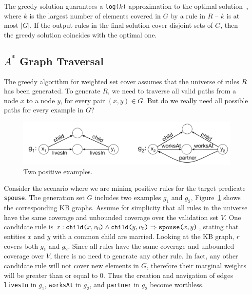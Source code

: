 The greedy solution guarantees a \texttt{log($k$)} approximation
to the optimal solution~\cite{chvatal1979greedy}, where $k$ is the largest number of elements covered in $G$ by a rule in $R$ -- $k$ is at most $|G|$. If the output rules in the final solution cover disjoint sets of $G$, then the greedy solution coincides with the optimal one.

\subsection{$A^*$ Graph Traversal}
The greedy algorithm for weighted set cover assumes that the universe of rules $R$ has been generated.
To generate $R$, we need to traverse all valid paths from a node $x$ to a node $y$, for every pair $(x,y) \in G$. But do we really need all possible paths for every example in $G$?
		\vspace{-1.5ex}

	\begin{figure}[htb]
		\centering
		\includegraphics[width=0.99\columnwidth]{include/figure/a*_graph_example.pdf}	
		\vspace{-4ex}
		\caption{Two positive examples.}
	\label{fig:positive_examples}
\end{figure}
		\vspace{-1.5ex}

\begin{example}
	Consider the scenario where we are mining positive rules for the target predicate \texttt{spouse}. The generation set $G$ includes two examples $g_1$ and $g_2$, Figure~\ref{fig:positive_examples} shows the corresponding KB graphs. %
	Assume for simplicity that all rules in the universe have the same coverage and unbounded coverage over the validation set $V$.
	One candidate rule is $r : \texttt{child(}x,v_0\texttt{)} \wedge \texttt{child(}y,v_0\texttt{)} \Rightarrow \texttt{spouse(}x,y\texttt{)}$, stating that entities $x$ and $y$ with a common child are married. Looking at the KB graph, $r$ covers both $g_1$ and $g_2$.
	Since all rules have the same coverage and unbounded coverage over $V$, 
	there is no need to generate any other rule. In fact, any other candidate rule will not cover new elements in $G$, therefore their marginal weights will be greater than or equal to $0$. 
	Thus the creation and navigation of edges \texttt{livesIn} in $g_1$, \texttt{worksAt} in $g_2$, and \texttt{partner} in $g_2$ become worthless.
\end{example}

